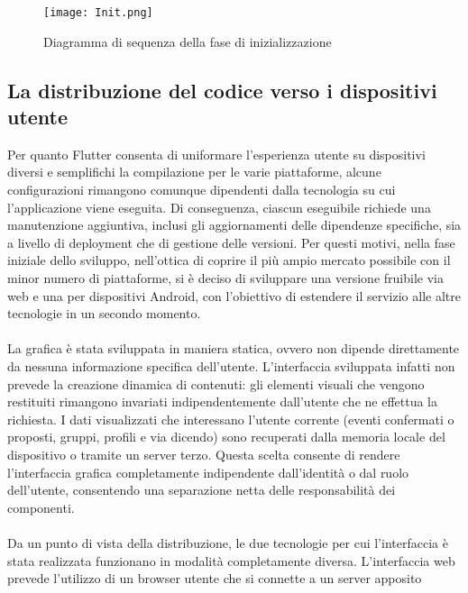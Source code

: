 \begin{figure}[h!]
    \begin{center}
        \texttt{[image: Init.png]}
        \caption{Diagramma di sequenza della fase di inizializzazione }
    \end{center}
\end{figure}


\clearpage

\subsection{La distribuzione del codice verso i dispositivi utente}

Per quanto Flutter consenta di uniformare l'esperienza utente su dispositivi diversi e 
semplifichi la compilazione per le varie piattaforme,
alcune configurazioni rimangono comunque dipendenti dalla tecnologia su cui l'applicazione viene eseguita.
Di conseguenza, ciascun eseguibile richiede una manutenzione aggiuntiva, 
inclusi gli aggiornamenti delle dipendenze specifiche,
sia a livello di deployment che di gestione delle versioni.
Per questi motivi, nella fase iniziale dello sviluppo,
nell'ottica di coprire il più ampio mercato possibile con il minor numero di piattaforme,
si è deciso di sviluppare una versione fruibile via web e una per dispositivi Android, 
con l'obiettivo di estendere il servizio alle altre tecnologie in un secondo momento.\\
\\
La grafica è stata sviluppata in maniera statica, 
ovvero non dipende direttamente da nessuna informazione specifica dell'utente.
L’interfaccia sviluppata infatti non prevede la creazione dinamica di contenuti:
gli elementi visuali che vengono restituiti rimangono invariati 
indipendentemente dall'utente che ne effettua la richiesta.
I dati visualizzati che interessano l'utente corrente 
(eventi confermati o proposti, gruppi, profili e via dicendo)
sono recuperati dalla memoria locale del dispositivo o tramite un server terzo.
Questa scelta consente di rendere l'interfaccia grafica completamente 
indipendente dall'identità o dal ruolo dell'utente,
consentendo una separazione netta delle responsabilità dei componenti.\\
\\
Da un punto di vista della distribuzione,
le due tecnologie per cui l'interfaccia è stata realizzata funzionano in modalità completamente diversa.
L'interfaccia web prevede l'utilizzo di un browser utente che si connette a un server apposito
